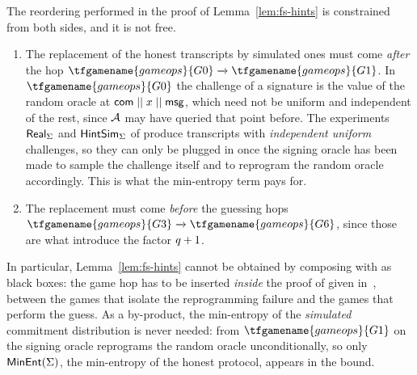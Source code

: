 \begin{remark}\label{rem:order}
    The reordering performed in the proof of Lemma~\ref{lem:fs-hints} is
    constrained from both sides, and it is not free.
    \begin{enumerate}[label=(\alph*)]
        \item The replacement of the honest transcripts by simulated ones must
            come \emph{after} the hop $\tfgamename{gameops}{G0} \to \tfgamename{gameops}{G1}$. In
            $\tfgamename{gameops}{G0}$ the challenge of a signature is the value of the
            random oracle at $\mathsf{com} \mathrel{||} x \mathrel{||} \textsf{msg}$, which need not be
            uniform and independent of the rest, since $\mathcal{A}$ may have queried
            that point before. The experiments $\mathsf{Real}_\Sigma$ and
            $\mathsf{HintSim}_\Sigma$ of  produce
            transcripts with \emph{independent uniform} challenges, so they can
            only be plugged in once the signing oracle has been made to sample
            the challenge itself and to reprogram the random oracle accordingly.
            This is what the min-entropy term pays for.
        \item The replacement must come \emph{before} the guessing hops
            $\tfgamename{gameops}{G3} \to \tfgamename{gameops}{G6}$, since those are what introduce
            the factor $q+1$.
    \end{enumerate}
    In particular, Lemma~\ref{lem:fs-hints} cannot be obtained by composing
     with  as black boxes:
    the game hop has to be inserted \emph{inside} the proof
    of  given in~\cite{EC:AABN02}, between the games that isolate the
    reprogramming failure and the games that perform the guess. As a by-product,
    the min-entropy of the \emph{simulated} commitment distribution is never
    needed: from $\tfgamename{gameops}{G1}$ on the signing oracle reprograms the random
    oracle unconditionally, so only $\mathsf{MinEnt}(\Sigma)$, the min-entropy of the
    honest protocol, appears in the bound.
\end{remark}
